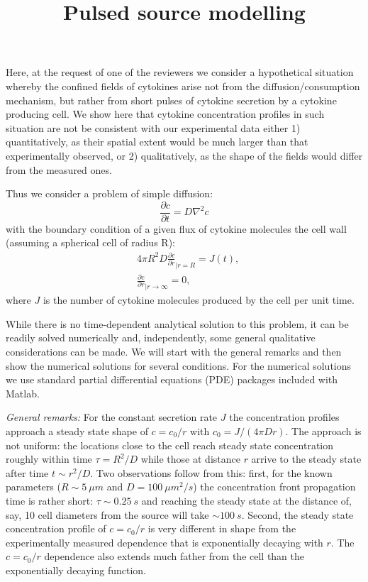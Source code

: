 \documentclass[11pt, oneside]{article}   	%
\title{Pulsed source modelling}
\author{}
\begin{document}
\maketitle

Here, at the request of one of the reviewers we consider a hypothetical situation whereby the confined fields of cytokines arise not from the diffusion/consumption mechanism, but rather from short pulses of cytokine secretion by a cytokine producing cell. We show here that cytokine concentration profiles in such situation are not be consistent with our experimental data either 1) quantitatively, as their spatial extent would be much larger than that experimentally observed, or 2) qualitatively, as the shape of the fields would differ from the measured ones.

Thus we consider a problem of simple diffusion:
\begin{equation}
\frac{\partial c}{ \partial t} = D \nabla^2 c
\label{Eq: Diffusion3D}
\end{equation}
with the boundary condition of a given flux of cytokine molecules the cell wall (assuming a spherical cell of radius R):
\begin{eqnarray}
&4\pi R^2 D \frac{\partial c}{ \partial r} _{|r=R}= J(t),  \nonumber \\ 
& \frac{\partial c}{ \partial r} _{|r \rightarrow \infty} = 0,
\label{Eq: BoundCond_Diff3D}
\end{eqnarray}
where $J$ is the number of cytokine molecules produced by the cell per unit time.

While there is no time-dependent analytical solution to this problem, it can be readily solved numerically and, independently, some general qualitative considerations can be made. We will start with the general remarks and then show the numerical solutions for several conditions. For the numerical solutions we use standard partial differential equations (PDE) packages included with Matlab.

\emph{General remarks:} For the constant secretion rate $J$ the concentration profiles approach a steady state shape of $c = c_0/r$ with $c_0 = J/(4\pi D r)$. The approach is not uniform: the locations close to the cell reach steady state concentration roughly within time $\tau = R^2/D$ while those at distance $r$ arrive to the steady state after time $t \sim r^2/D$. Two observations follow from this: first, for the known parameters ($R\sim 5~\mu m$ and $D = 100~\mu m^2/s$) the concentration front propagation time is rather short: $\tau \sim 0.25~s$ and reaching the steady state at the distance of, say, 10 cell diameters from the source will take $\sim 100~s$. Second, the steady state concentration profile of $c = c_0/r$ is very different in shape from the experimentally measured dependence that is exponentially decaying with $r$. The $c = c_0/r$ dependence also extends much father from the cell than the exponentially decaying function.
\end{document}
